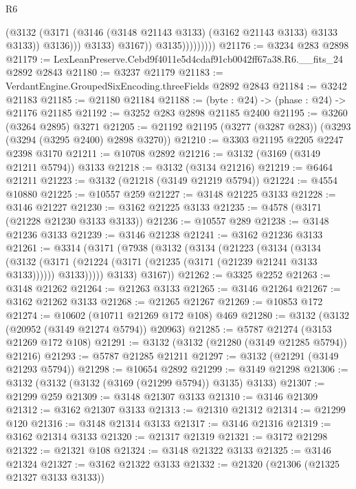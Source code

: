 \begin{lexlean}{R6}
\begin{coremodule}
                                (@3132
                                  (@3171
                                    (@3146 (@3148 @21143 @3133) (@3162 @21143 @3133) @3133 @3133))
                                  @3136)))
                            @3133)
                          @3167))
                      @3135)))))))))
@21176 := @3234 @283 @2898
@21179 := LexLeanPreserve.Cebd9f4011e5d4cdaf91cb0042ff67a38.R6.__fits_24 @2892 @2843
@21180 := @3237 @21179
@21183 := VerdantEngine.GroupedSixEncoding.threeFields @2892 @2843
@21184 := @3242 @21183
@21185 := @21180 @21184
@21188 := (byte : @24) -> (phase : @24) -> @21176 @21185
@21192 := @3252 @283 @2898 @21185 @2400
@21195 := @3260 (@3264 @2895) @3271
@21205 := @21192 @21195 (@3277 (@3287 @283)) (@3293 (@3294 (@3295 @2400) @2898 @3270))
@21210 := @3303 @21195 @2205 @2247 @2398 @3170
@21211 := @10708 @2892
@21216 := @3132 (@3169 (@3149 @21211 @5794)) @3133
@21218 := @3132 (@3134 @21216)
@21219 := @6464 @21211
@21223 := @3132 (@21218 (@3149 @21219 @5794))
@21224 := @4554 @10880
@21225 := @10557 @259
@21227 := @3148 @21225 @3133
@21228 := @3146 @21227
@21230 := @3162 @21225 @3133
@21235 := @4578 (@3171 (@21228 @21230 @3133 @3133))
@21236 := @10557 @289
@21238 := @3148 @21236 @3133
@21239 := @3146 @21238
@21241 := @3162 @21236 @3133
@21261 := @3314
    (@3171
      (@7938
        (@3132
          (@3134
            (@21223
              (@3134
                (@3134
                  (@3132
                    (@3171 (@21224 (@3171 (@21235 (@3171 (@21239 @21241 @3133 @3133))))))
                    @3133)))))
          @3133)
        @3167))
@21262 := @3325 @2252
@21263 := @3148 @21262
@21264 := @21263 @3133
@21265 := @3146 @21264
@21267 := @3162 @21262 @3133
@21268 := @21265 @21267
@21269 := @10853 @172
@21274 := @10602 (@10711 @21269 @172 @108) @469
@21280 := @3132 (@3132 (@20952 (@3149 @21274 @5794)) @20963)
@21285 := @5787 @21274 (@3153 @21269 @172 @108)
@21291 := @3132 (@3132 (@21280 (@3149 @21285 @5794)) @21216)
@21293 := @5787 @21285 @21211
@21297 := @3132 (@21291 (@3149 @21293 @5794))
@21298 := @10654 @2892
@21299 := @3149 @21298
@21306 := @3132 (@3132 (@3132 (@3169 (@21299 @5794)) @3135) @3133)
@21307 := @21299 @259
@21309 := @3148 @21307 @3133
@21310 := @3146 @21309
@21312 := @3162 @21307 @3133
@21313 := @21310 @21312
@21314 := @21299 @120
@21316 := @3148 @21314 @3133
@21317 := @3146 @21316
@21319 := @3162 @21314 @3133
@21320 := @21317 @21319
@21321 := @3172 @21298
@21322 := @21321 @108
@21324 := @3148 @21322 @3133
@21325 := @3146 @21324
@21327 := @3162 @21322 @3133
@21332 := @21320 (@21306 (@21325 @21327 @3133 @3133))

\end{coremodule}
\end{lexlean}

